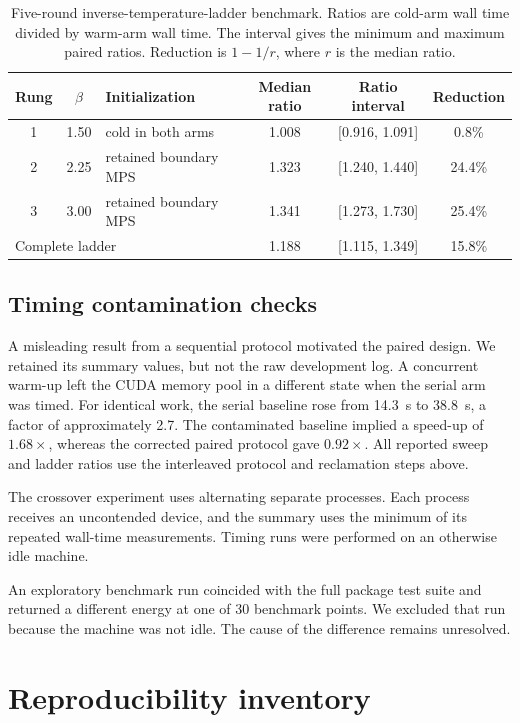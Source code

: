\documentclass[preprint,12pt,a4paper]{elsarticle}
\begin{document}
\begin{table}[htbp]
\footnotesize
\centering
\caption{Five-round inverse-temperature-ladder benchmark. Ratios are cold-arm
wall time divided by warm-arm wall time. The interval gives the minimum and
maximum paired ratios. Reduction is $1-1/r$, where $r$ is the median ratio.}
\label{tab:supp-ladder}
\begin{tabular}{@{}cclccc@{}}
\toprule
Rung & $\beta$ & Initialization &
Median ratio & Ratio interval & Reduction \\
\midrule
1 & 1.50 & cold in both arms & 1.008 & [0.916, 1.091] & 0.8\% \\
2 & 2.25 & retained boundary MPS & 1.323 & [1.240, 1.440] & 24.4\% \\
3 & 3.00 & retained boundary MPS & 1.341 & [1.273, 1.730] & 25.4\% \\
\midrule
\multicolumn{3}{l}{Complete ladder} &
1.188 & [1.115, 1.349] & 15.8\% \\
\bottomrule
\end{tabular}
\end{table}

\subsection{Timing contamination checks}

A misleading result from a sequential protocol motivated the paired design. We
retained its summary values, but not the raw development log. A concurrent
warm-up left the CUDA memory pool in a different state when the serial arm was
timed.
For identical work, the serial baseline rose from 14.3~s to 38.8~s, a factor of
approximately 2.7. The contaminated baseline implied a speed-up of
$1.68\times$, whereas the corrected paired protocol gave $0.92\times$. All
reported sweep and ladder ratios use the interleaved protocol and reclamation
steps above.

The crossover experiment uses alternating separate processes. Each process
receives an uncontended device, and the summary uses the minimum of its repeated
wall-time measurements. Timing runs were performed on an otherwise idle
machine.

An exploratory benchmark run coincided with the full package test suite and
returned a different energy at one of 30 benchmark points. We excluded that run
because the machine was not idle. The cause of the difference remains unresolved.
\FloatBarrier

\section{Reproducibility inventory}
\label{sec:supp-reproducibility}
\end{document}
